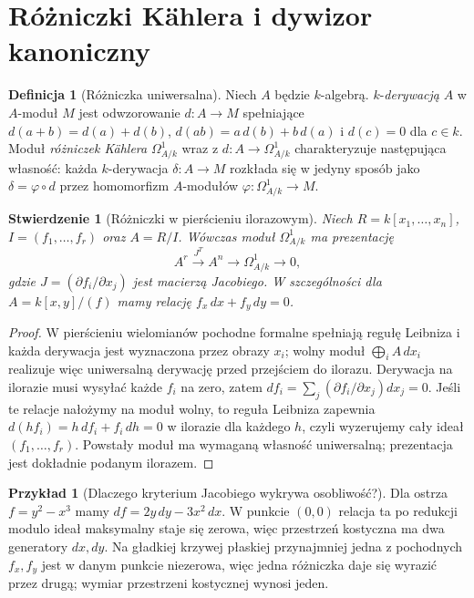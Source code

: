 \documentclass[11pt,a4paper,openany]{report}
\numberwithin{equation}{section}
\theoremstyle{plain}
\newtheorem{stwierdzenie}[twierdzenie]{Stwierdzenie}
\theoremstyle{definition}
\newtheorem{definicja}[twierdzenie]{Definicja}
\newtheorem{przyklad}[twierdzenie]{Przykład}
\theoremstyle{remark}
\begin{document}
\section{Różniczki Kählera i dywizor kanoniczny}
\label{sec:differentials}

\begin{definicja}[Różniczka uniwersalna]
Niech $A$ będzie $k$-algebrą. $k$-\emph{derywacją}
$A$ w $A$-moduł $M$ jest odwzorowanie
$d:A\to M$ spełniające $d(a+b)=d(a)+d(b)$,
$d(ab)=a\,d(b)+b\,d(a)$ i $d(c)=0$ dla $c\in k$.
Moduł \emph{różniczek Kählera} $\Omega^1_{A/k}$
wraz z $d:A\to\Omega^1_{A/k}$ charakteryzuje
następująca własność: każda $k$-derywacja
$\delta:A\to M$ rozkłada się w jedyny sposób
jako $\delta=\varphi\circ d$ przez homomorfizm
$A$-modułów $\varphi:\Omega^1_{A/k}\to M$.
\end{definicja}

\begin{stwierdzenie}[Różniczki w pierścieniu ilorazowym]
\label{st:kahler}
Niech $R=k[x_1,\ldots,x_n]$, $I=(f_1,\ldots,f_r)$
oraz $A=R/I$. Wówczas moduł $\Omega^1_{A/k}$ ma prezentację
\[
 A^r\xrightarrow{J^T}A^n\longrightarrow
 \Omega^1_{A/k}\longrightarrow0,
\]
gdzie $J=(\partial f_i/\partial x_j)$ jest
macierzą Jacobiego. W szczególności dla
$A=k[x,y]/(f)$ mamy relację $f_x\,dx+f_y\,dy=0$.
\end{stwierdzenie}
\begin{proof}
W pierścieniu wielomianów pochodne formalne
spełniają regułę Leibniza i każda derywacja
jest wyznaczona przez obrazy $x_i$;
wolny moduł $\bigoplus_i A\,dx_i$ realizuje więc
uniwersalną derywację przed przejściem do ilorazu.
Derywacja na ilorazie musi wysyłać każde $f_i$
na zero, zatem $df_i=\sum_j(\partial f_i/\partial x_j)dx_j=0$.
Jeśli te relacje nałożymy na moduł wolny,
to reguła Leibniza zapewnia $d(hf_i)=h\,df_i+f_i\,dh=0$
w ilorazie dla każdego $h$, czyli wyzerujemy
cały ideał $(f_1,\ldots,f_r)$. Powstały moduł
ma wymaganą własność uniwersalną; prezentacja
jest dokładnie podanym ilorazem.
\end{proof}

\begin{przyklad}[Dlaczego kryterium Jacobiego wykrywa osobliwość?]
Dla ostrza $f=y^2-x^3$ mamy
$df=2y\,dy-3x^2\,dx$. W punkcie $(0,0)$
relacja ta po redukcji modulo ideał maksymalny
staje się zerowa, więc przestrzeń kostyczna
ma dwa generatory $dx,dy$. Na gładkiej krzywej
płaskiej przynajmniej jedna z pochodnych $f_x,f_y$
jest w danym punkcie niezerowa, więc jedna
różniczka daje się wyrazić przez drugą;
wymiar przestrzeni kostycznej wynosi jeden.
\end{przyklad}
\end{document}
